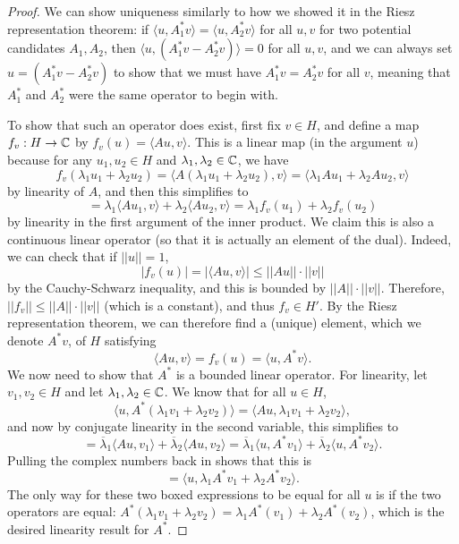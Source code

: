 \begin{proof}
We can show uniqueness similarly to how we showed it in the Riesz representation theorem: if $\langle u, A_1^\ast v \rangle= \langle u, A_2^\ast v \rangle$ for all $u, v$ for two potential candidates $A_1, A_2$, then $\langle u, (A_1^\ast v - A_2^\ast v) \rangle = 0$ for all $u, v$, and we can always set $u = (A_1^\ast v - A_2^\ast v)$ to show that we must have $A_1^\ast v = A_2^\ast v$ for all $v$, meaning that $A_1^\ast$ and $A_2^\ast$ were the same operator to begin with.

To show that such an operator does exist, first fix $v \in H$, and define a map $f_v: H \to \mathbb C$ by $f_v(u) = \langle Au, v \rangle$. This is a linear map (in the argument $u$) because for any $u_1, u_2 \in H$ and $\lambda_1, \lambda_2 \in \mathbb C$, we have
\[
    f_v(\lambda_1 u_1 + \lambda_2 u_2) = \langle A(\lambda_1 u_1 + \lambda_2 u_2), v \rangle = \langle \lambda_1 Au_1 + \lambda_2 Au_2, v \rangle
\]
by linearity of $A$, and then this simplifies to 
\[
    = \lambda_1 \langle Au_1, v \rangle + \lambda_2 \langle Au_2, v \rangle = \lambda_1 f_v(u_1) + \lambda_2 f_v(u_2)
\]  
by linearity in the first argument of the inner product. We claim this is also a continuous linear operator (so that it is actually an element of the dual). Indeed, we can check that if $||u|| = 1$, 
\[
    |f_v(u)| = |\langle Au, v \rangle| \le ||Au|| \cdot ||v||
\]
by the Cauchy-Schwarz inequality, and this is bounded by $||A|| \cdot ||v||$. Therefore, $||f_v|| \le ||A|| \cdot ||v||$ (which is a constant), and thus $f_v \in H'$. By the Riesz representation theorem, we can therefore find a (unique) element, which we denote $A^\ast v$, of $H$ satisfying
\[
    \langle Au, v \rangle = f_v(u) = \langle u, A^\ast v \rangle.
\]
We now need to show that $A^\ast$ is a bounded linear operator. For linearity, let $v_1, v_2 \in H$ and let $\lambda_1, \lambda_2 \in \mathbb C$. We know that for all $u \in H$, 
\[
    \boxed{\langle u, A^\ast(\lambda_1 v_1 + \lambda_2 v_2) \rangle} = \langle Au, \lambda_1 v_1 + \lambda_2 v_2 \rangle,
\]
and now by conjugate linearity in the second variable, this simplifies to 
\[
    = \overline{\lambda}_1 \langle Au, v_1 \rangle + \overline{\lambda}_2 \langle Au, v_2 \rangle = \overline{\lambda}_1 \langle u, A^\ast v_1 \rangle + \overline{\lambda}_2 \langle u, A^\ast v_2 \rangle.
\]
Pulling the complex numbers back in shows that this is 
\[
    = \boxed{\langle u, \lambda_1 A^\ast v_1 + \lambda_2 A^\ast v_2 \rangle}.
\]
The only way for these two boxed expressions to be equal for all $u$ is if the two operators are equal: $A^\ast(\lambda_1 v_1 + \lambda_2v_2) = \lambda_1 A^\ast(v_1) + \lambda_2 A^\ast(v_2)$, which is the desired linearity result for $A^\ast$.


\end{proof}
